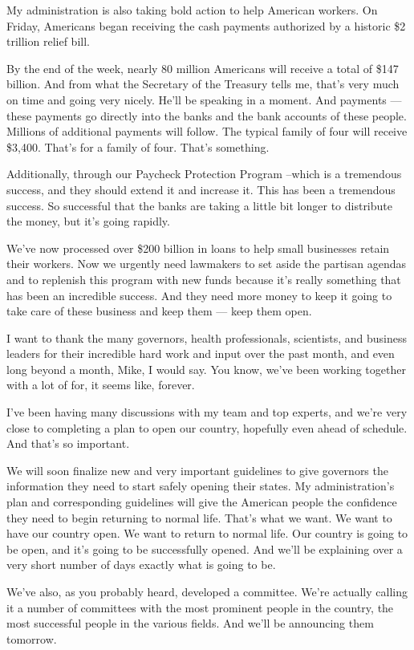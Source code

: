 My administration is also taking bold action to help American workers.
On Friday, Americans began receiving the cash payments authorized by a
historic \$2 trillion relief bill.

By the end of the week, nearly 80 million Americans will receive a total
of \$147 billion. And from what the Secretary of the Treasury tells me,
that's very much on time and going very nicely. He'll be speaking in a
moment. And payments --- these payments go directly into the banks and
the bank accounts of these people. Millions of additional payments will
follow. The typical family of four will receive \$3,400. That's for a
family of four. That's something.

Additionally, through our Paycheck Protection Program --which is a
tremendous success, and they should extend it and increase it. This has
been a tremendous success. So successful that the banks are taking a
little bit longer to distribute the money, but it's going rapidly.

We've now processed over \$200 billion in loans to help small businesses
retain their workers. Now we urgently need lawmakers to set aside the
partisan agendas and to replenish this program with new funds because
it's really something that has been an incredible success. And they need
more money to keep it going to take care of these business and keep them
--- keep them open.

I want to thank the many governors, health professionals, scientists,
and business leaders for their incredible hard work and input over the
past month, and even long beyond a month, Mike, I would say. You know,
we've been working together with a lot of for, it seems like, forever.

I've been having many discussions with my team and top experts, and
we're very close to completing a plan to open our country, hopefully
even ahead of schedule. And that's so important.

We will soon finalize new and very important guidelines to give
governors the information they need to start safely opening their
states. My administration's plan and corresponding guidelines will give
the American people the confidence they need to begin returning to
normal life. That's what we want. We want to have our country open. We
want to return to normal life. Our country is going to be open, and it's
going to be successfully opened. And we'll be explaining over a very
short number of days exactly what is going to be.

We've also, as you probably heard, developed a committee. We're actually
calling it a number of committees with the most prominent people in the
country, the most successful people in the various fields. And we'll be
announcing them tomorrow.

